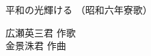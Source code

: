 \documentclass[10pt,b5j]{tarticle} %
\begin{document}
\begin{minipage}[c]{0.7\hsize} %
    \begin{center}
        {\LARGE
            平和の光輝ける %
        }
        {\small 
            （昭和六年寮歌） %
        }
    \end{center}
\end{minipage}
\begin{minipage}[c]{0.3\hsize} %
    \begin{flushright} %
        広瀬英三君 作歌\\金景洙君 作曲 %
    \end{flushright}
\end{minipage}
\end{document}
